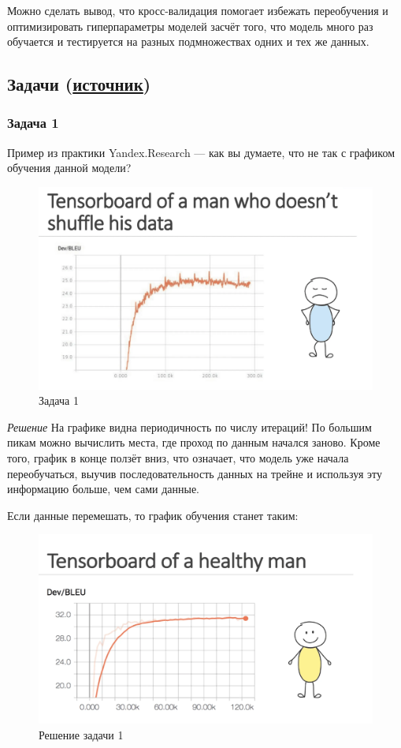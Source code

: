 Можно сделать вывод, что кросс-валидация помогает избежать переобучения и оптимизировать гиперпараметры моделей засчёт того, что модель много раз обучается и тестируется на разных подмножествах одних и тех же данных.

\subsection{Задачи (\href{https://education.yandex.ru/handbook/ml/article/kross-validaciya}{источник})}

\subsubsection{Задача 1}
Пример из практики Yandex.Research — как вы думаете, что не так с графиком обучения данной модели?

\begin{figure}[h]
	\centering
	\includegraphics[width=\textwidth/2]{problem-1.png}
	\caption{Задача 1}
	\label{img:problem-1}
\end{figure}

\textit{Решение}
На графике видна периодичность по числу итераций! По большим пикам можно вычислить места, где проход по данным начался заново. Кроме того, график в конце ползёт вниз, что означает, что модель уже начала переобучаться, выучив последовательность данных на трейне и используя эту информацию больше, чем сами данные.

Если данные перемешать, то график обучения станет таким:

\begin{figure}[h]
	\centering
	\includegraphics[width=\textwidth/2]{sol-1.png}
	\caption{Решение задачи 1}
	\label{img:sol-1}
\end{figure}

